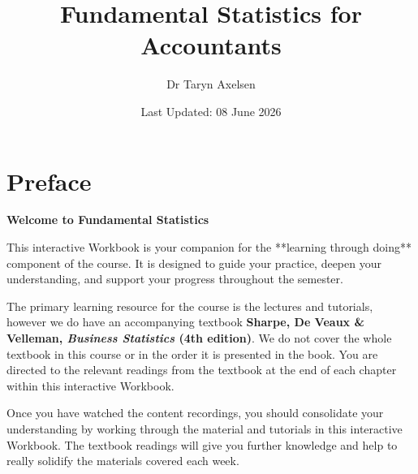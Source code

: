 \documentclass[
  11pt,
  oneside]{scrbook}
\title{Fundamental Statistics for Accountants}
\author{Dr Taryn Axelsen}
\date{Last Updated: 08 June 2026}
\begin{document}
\maketitle

{
\setcounter{tocdepth}{1}
\tableofcontents
}
\newcommand{\cms}{\,\text{cm}}
\newcommand{\dLs}{\,\text{dL}}
\newcommand{\xdLs}{\text{dL}}

\newcommand{\fmols}{\,\text{fmol}}
\newcommand{\ft}{\,\text{ft}}
\newcommand{\gs}{\,\text{g}}
\newcommand{\hs}{\,\text{h}}
\newcommand{\xhs}{\text{h}}

\newcommand{\has}{\,\text{ha}}
\newcommand{\xhas}{\text{ha}}

\newcommand{\inches}{\,\text{inches}}
\newcommand{\kgs}{\,\text{kg}}
\newcommand{\kms}{\,\text{km}}
\newcommand{\kWhs}{\,\text{kWh}}
\newcommand{\lbs}{\,\text{lb}}
\newcommand{\Ls}{\,\text{L}}
\newcommand{\xLs}{\text{L}}

\newcommand{\checkbox}{\(\square\)}


\frontmatter

\chapter*{Preface}\label{preface}

\begin{bannerbox}
\textbf{Welcome to Fundamental Statistics}

This interactive Workbook is your companion for the **learning through doing** component of the course.   It is designed to guide your practice, deepen your understanding, and support your progress throughout the semester.
\end{bannerbox}

The primary learning resource for the course is the lectures and tutorials, however we do have an accompanying textbook \textbf{Sharpe, De Veaux \& Velleman,
\emph{Business Statistics} (4th edition)}. We do not cover the whole textbook in this
course or in the order it is presented in the book. You are directed to the relevant
readings from the textbook at the end of each chapter within this interactive Workbook.

Once you have watched the content recordings, you should consolidate your understanding
by working through the material and tutorials in this interactive Workbook. The textbook
readings will give you further knowledge and help to really solidify the materials
covered each week.
\end{document}
